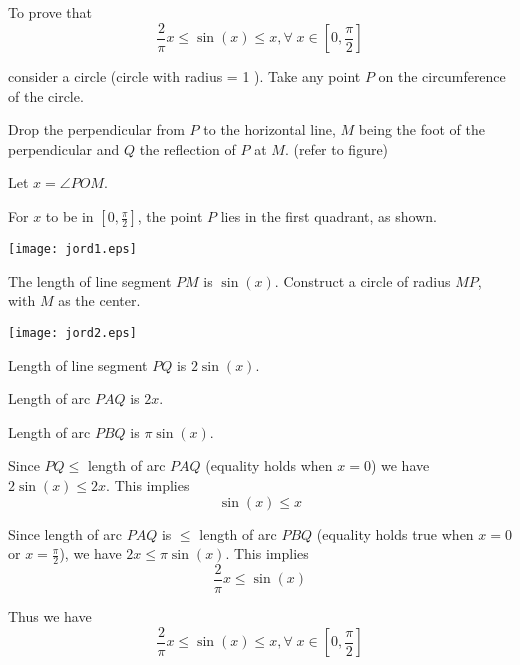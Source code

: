 \documentclass[12pt]{article}
\begin{document}
To prove that
$$ \frac{2}{\pi}x\leq\sin(x)\leq x, \forall\;x\in [0,\frac{\pi}{2}] $$

consider a  circle (circle with radius = 1 ). Take any point $P$ on the circumference of the circle.

Drop the perpendicular from $P$ to the horizontal line, $M$ being the foot of the perpendicular and $Q$ the reflection of $P$ at $M$.
(refer to figure)

Let $x = \angle POM.$

For $x$ to be in $[0,\frac{\pi}{2}]$, the point $P$ lies in the first quadrant, as shown.

\begin{center}
\texttt{[image: jord1.eps]}
\end{center}

The length of line segment $PM$ is $\sin(x)$.
Construct a circle of radius $MP$, with $M$ as the center.

\begin{center}
\texttt{[image: jord2.eps]}
\end{center}

Length of line segment $PQ$ is $2\sin(x)$.

Length of arc $PAQ$ is $2x$.

Length of arc $PBQ$ is $\pi\sin(x)$.

Since $PQ \leq$ length of arc $PAQ$ (equality holds when $x = 0$)                                          
we have $2\sin(x) \leq 2x$.                                                                                  
This implies  $$\sin(x) \leq x$$

Since length of arc $PAQ$ is $\leq $ length of arc $PBQ$ (equality holds true when $x = 0$ or $x = \frac{\pi}{2}$),
we have $2x \leq \pi\sin(x)$.                                                                           
This implies $$\frac{2}{\pi}x \leq \sin(x)$$

Thus we have 
$$ \frac{2}{\pi}x\leq\sin(x)\leq x,   \forall\;x\in [0,\frac{\pi}{2}] $$
\end{document}
